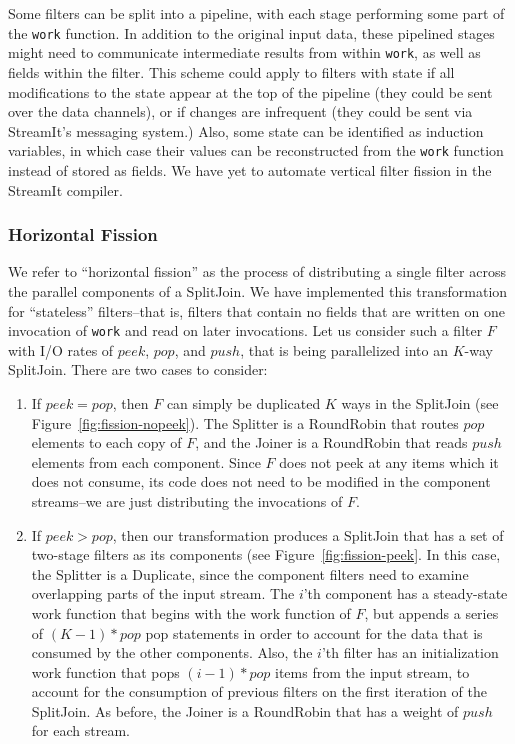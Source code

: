 Some filters can be split into a pipeline, with each stage performing
some part of the {\tt work} function.  In addition to the original
input data, these pipelined stages might need to communicate
intermediate results from within {\tt work}, as well as fields within
the filter.  This scheme could apply to filters with state if all
modifications to the state appear at the top of the pipeline (they
could be sent over the data channels), or if changes are infrequent
(they could be sent via StreamIt's messaging system.)  Also, some
state can be identified as induction variables, in which case their
values can be reconstructed from the {\tt work} function instead of
stored as fields.  We have yet to automate vertical filter fission in
the StreamIt compiler.

\subsubsection{Horizontal Fission}

We refer to ``horizontal fission'' as the process of distributing a
single filter across the parallel components of a SplitJoin.  We have
implemented this transformation for ``stateless'' filters--that is,
filters that contain no fields that are written on one invocation of
{\tt work} and read on later invocations.  Let us consider such a
filter $F$ with I/O rates of $peek$, $pop$, and $push$, that is being
parallelized into an $K$-way SplitJoin.  There are two cases to
consider:
\begin{enumerate}
\item If {\bf $peek = pop$}, then $F$ can simply be duplicated $K$
ways in the SplitJoin (see Figure~\ref{fig:fission-nopeek}).  The
Splitter is a RoundRobin that routes $pop$ elements to each copy of
$F$, and the Joiner is a RoundRobin that reads $push$ elements from
each component.  Since $F$ does not peek at any items which it does
not consume, its code does not need to be modified in the component
streams--we are just distributing the invocations of $F$.

\item If {\bf $peek > pop$}, then our transformation produces a
SplitJoin that has a set of two-stage filters as its components (see
Figure~\ref{fig:fission-peek}.  In this case, the Splitter is a
Duplicate, since the component filters need to examine overlapping
parts of the input stream.  The $i$'th component has a steady-state
work function that begins with the work function of $F$, but appends a
series of $(K-1)*pop$ pop statements in order to account for the data
that is consumed by the other components.  Also, the $i$'th filter has
an initialization work function that pops $(i-1)*pop$ items from the
input stream, to account for the consumption of previous filters on
the first iteration of the SplitJoin.  As before, the Joiner is a
RoundRobin that has a weight of $push$ for each stream.
\end{enumerate}

